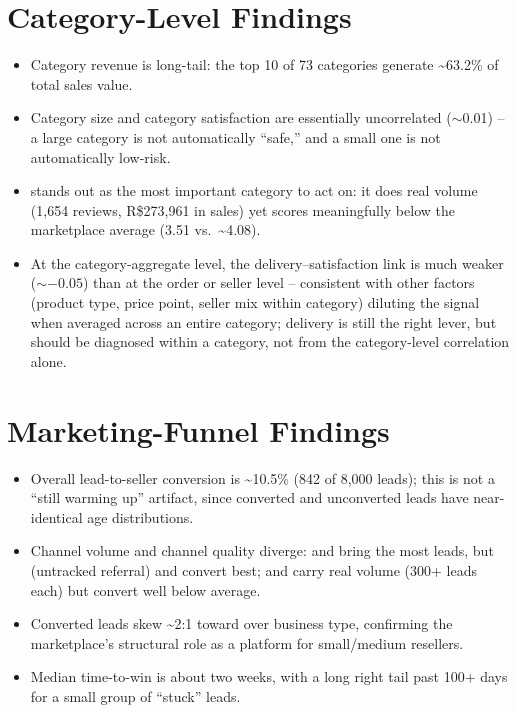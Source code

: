 \documentclass[11pt,a4paper]{report}
\begin{document}
\section{Category-Level Findings}
\begin{itemize}
    \item Category revenue is long-tail: the top 10 of 73 categories generate \textasciitilde63.2\%
        of total sales value.
    \item Category size and category satisfaction are essentially uncorrelated ($\sim$0.01) -- a
        large category is not automatically ``safe,'' and a small one is not automatically
        low-risk.
    \item {} stands out as the most important category to act on: it does
        real volume (1{,}654 reviews, R\$273{,}961 in sales) yet scores meaningfully below the
        marketplace average (3.51 vs.\ \textasciitilde4.08).
    \item At the category-aggregate level, the delivery--satisfaction link is much weaker
        ($\sim -0.05$) than at the order or seller level -- consistent with other factors (product
        type, price point, seller mix within category) diluting the signal when averaged across an
        entire category; delivery is still the right lever, but should be diagnosed within a
        category, not from the category-level correlation alone.
\end{itemize}

\section{Marketing-Funnel Findings}
\begin{itemize}
    \item Overall lead-to-seller conversion is \textasciitilde10.5\% (842 of 8{,}000 leads); this is
        not a ``still warming up'' artifact, since converted and unconverted leads have
        near-identical age distributions.
    \item Channel volume and channel quality diverge:  and
         bring the most leads, but  (untracked referral) and
         convert best;  and  carry real volume
        (300+ leads each) but convert well below average.
    \item Converted leads skew \textasciitilde2:1 toward  over
         business type, confirming the marketplace's structural role as a
        platform for small/medium resellers.
    \item Median time-to-win is about two weeks, with a long right tail past 100+ days for a small
        group of ``stuck'' leads.
\end{itemize}
\end{document}
